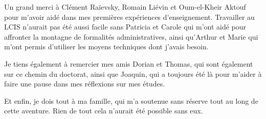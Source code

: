 Un grand merci à Clément Raïevsky, Romain Liévin et Oum-el-Kheir Aktouf pour m’avoir aidé dans mes premières expériences d’enseignement. Travailler au LCIS n’aurait pas été aussi facile sans Patricia et Carole qui m'ont aidé pour affronter la montagne de formalités administratives, ainsi qu'Arthur et Marie qui m'ont permis d'utiliser les moyens techniques dont j'avais besoin.

Je tiens également à remercier mes amis Dorian et Thomas, qui sont également sur ce chemin du doctorat, ainsi que Joaquin, qui a toujours été là pour m’aider à faire une pause dans mes réflexions sur mes études.

Et enfin, je dois tout à ma famille, qui m’a soutenue sans réserve tout au long de cette aventure. Rien de tout cela n’aurait été possible sans eux.


\endgroup



